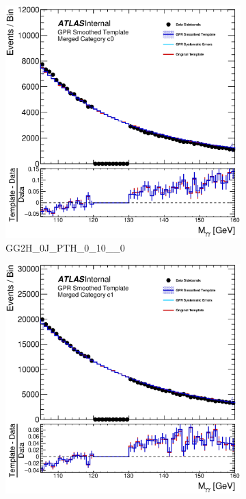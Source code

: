 \begin{figure} 
\begin{center}
\begin{subfigure}[T]{0.49\linewidth}
	\centering
	\includegraphics[width=\linewidth]{figures/background/gpr/coupCatTemplates/GPR_Smoothed_Plot_hmgg_c0.eps}
	\caption{GG2H\_0J\_PTH\_0\_10\_\_0}
\end{subfigure}
\begin{subfigure}[T]{0.49\linewidth}
	\centering
	\includegraphics[width=\linewidth]{figures/background/gpr/coupCatTemplates/GPR_Smoothed_Plot_hmgg_c1.eps}

\end{subfigure}
\end{center}
\end{figure}

